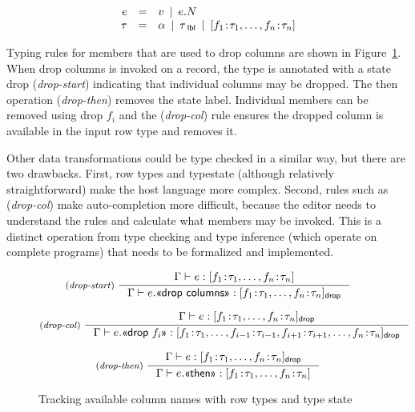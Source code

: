 \documentclass[a4paper,UKenglish]{lipics-v2016}
\theoremstyle{plain}
\theoremstyle{definition}
\newcommand{\lsep}{~\,|\,~}
\newcommand{\ident}[1]{\textnormal{\sffamily #1}}
\newcommand{\qident}[1]{\textnormal{\sffamily \guillemotleft #1\guillemotright}}
\begin{document}
\noindent
\begin{equation*}
\begin{array}{rcl}  
e&=&v \lsep e.N\\
\tau&=&\alpha \lsep \tau_\ident{lbl} \lsep [f_1\!:\!\tau_1, \ldots, f_n\!:\!\tau_n] 
\end{array}  
\end{equation*}

\noindent
Typing rules for members that are used to drop columns are shown in Figure~\ref{fig:fancy-types}.
When \qident{drop columns} is invoked on a record, the type is annotated with a state \ident{drop}
(\emph{drop-start}) indicating that individual columns may be dropped. The \ident{then} 
operation (\emph{drop-then}) removes the state label. Individual members can be removed using
\qident{drop $f_i$} and the (\emph{drop-col}) rule ensures the dropped column is available in the
input row type and removes it.

Other data transformations could be type checked in a similar way, but there are two drawbacks.
First, row types and typestate (although relatively straightforward) make the host language more
complex. Second, rules such as (\emph{drop-col}) make auto-completion more difficult, because the
editor needs to understand the rules and calculate what members may be invoked. This is a distinct
operation from type checking and type inference (which operate on complete programs) that needs 
to be formalized and implemented.


\begin{figure}

\begin{equation*}
\inference[(\emph{drop-start})~]
  {\Gamma \vdash e : [f_1\!:\!\tau_1, \ldots, f_n\!:\!\tau_n]}
  {\Gamma \vdash e.\qident{drop columns}: [f_1\!:\!\tau_1, \ldots, f_n\!:\!\tau_n]_{\ident{drop}}}
\end{equation*}

\begin{equation*}
\inference[(\emph{drop-col})~]
  {\Gamma \vdash e : [f_1\!:\!\tau_1, \ldots, f_n\!:\!\tau_n]_{\ident{drop}}}
  {\Gamma \vdash e.\qident{drop~$f_i$}: [f_1\!:\!\tau_1, \ldots, f_{i-1}\!:\!\tau_{i-1}, f_{i+1}\!:\!\tau_{i+1}, \ldots, f_n\!:\!\tau_n ]_{\ident{drop}}}
\end{equation*}

\begin{equation*}
\inference[(\emph{drop-then})~]
  {\Gamma \vdash e : [f_1\!:\!\tau_1, \ldots, f_n\!:\!\tau_n]_{\ident{drop}}}
  {\Gamma \vdash e.\qident{then}: [f_1\!:\!\tau_1, \ldots, f_n\!:\!\tau_n]}
\end{equation*}


\caption{Tracking available column names with row types and type state}
\label{fig:fancy-types}
\end{figure}
\end{document}
